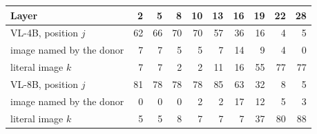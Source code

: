 \begin{tabular}{lrrrrrrrrr}
\toprule
Layer & 2 & 5 & 8 & 10 & 13 & 16 & 19 & 22 & 28 \\
\midrule
VL-4B, position $j$ & 62 & 66 & 70 & 70 & 57 & 36 & 16 & 4 & 5 \\
\quad image named by the donor & 7 & 7 & 5 & 5 & 7 & 14 & 9 & 4 & 0 \\
\quad literal image $k$ & 7 & 7 & 2 & 2 & 11 & 16 & 55 & 77 & 77 \\
VL-8B, position $j$ & 81 & 78 & 78 & 78 & 85 & 63 & 32 & 8 & 5 \\
\quad image named by the donor & 0 & 0 & 0 & 2 & 2 & 17 & 12 & 5 & 3 \\
\quad literal image $k$ & 5 & 5 & 8 & 7 & 7 & 7 & 37 & 80 & 88 \\
\bottomrule
\end{tabular}
